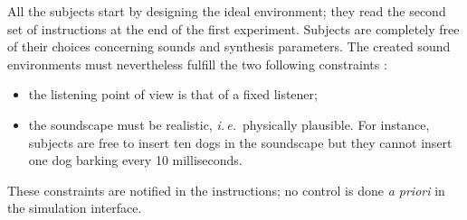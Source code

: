 \documentclass[12pt]{elsarticle}
\newcommand{\ie}{\emph{i.\,e.}}
\newcommand{\cf}{cf.}
\providecommand{\DIFaddbegin}{} %
\providecommand{\DIFaddend}{} %
\begin{document}
All the subjects start by designing the ideal environment; they read the second set of instructions at the end of the first experiment. Subjects are completely free of their choices concerning sounds and synthesis parameters. The created sound environments must nevertheless fulfill the two following constraints :


 \begin{itemize} 
\item the listening point of view is that of a fixed listener;
\item the soundscape must be realistic, \ie~physically plausible. For instance, subjects are free to insert ten dogs in the soundscape but they cannot insert one dog barking every 10 milliseconds.
 \end{itemize} 


These constraints are notified in the instructions; no control is done \emph{a priori} in the simulation interface.

\DIFaddbegin 

\DIFaddend %
%
\end{document}

